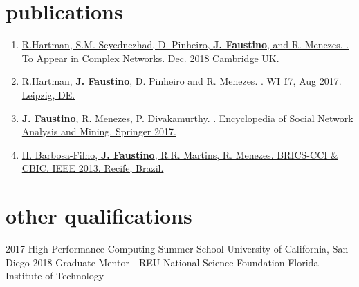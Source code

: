 \documentclass[]{cv-style}          %
\begin{document}
\section{publications}
  \vspace{-0.2cm}
 \begin{enumerate}
    \item \href{https://www.complexnetworks.org/program/}{R.Hartman, S.M. Seyednezhad, D. Pinheiro, \textbf{J. Faustino}, and R. Menezes. . To Appear in Complex Networks. Dec. 2018 Cambridge UK.}
    \item \href{https://doi.org/10.1145/3106426.3106493}{R.Hartman, \textbf{J. Faustino}, D. Pinheiro and R. Menezes. . WI \'17, Aug 2017. Leipzig, DE.}
     \item \href{http://dx.doi.org/10.1007/978-1-4614-7163-9_78-1}{\textbf{J. Faustino}, R. Menezes, P. Divakamurthy. .  Encyclopedia of Social Network Analysis and Mining. Springer 2017.} 
     \item \href{http://doi.computer.org/10.1109/BRICS-CCI-CBIC.2013.115}{ H. Barbosa-Filho, \textbf{J. Faustino}, R.R. Martins, R. Menezes.  BRICS-CCI \& CBIC. IEEE 2013. Recife, Brazil.}
 \end{enumerate}
\section{other qualifications}
\begin{entrylist}
\entry
{2017}
{High Performance Computing Summer School}
{University of California, San Diego}
{\vspace{-0.3cm}}
\entry
{2018}
{Graduate Mentor - REU National Science Foundation}
{Florida Institute of Technology}
{\vspace{-0.3cm}}
\end{entrylist}
\end{document}
